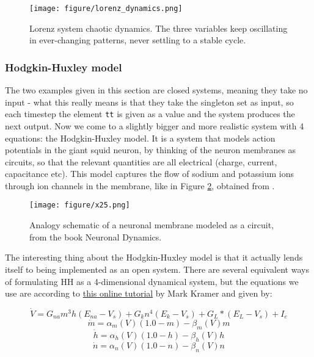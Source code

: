 \begin{figure}
    \centering
    \texttt{[image: figure/lorenz\_dynamics.png]}
    \caption{Lorenz system chaotic dynamics. The three variables keep oscillating in ever-changing patterns, never settling to a stable cycle.}
    \label{fig:lorenz_dynamics}
\end{figure}


\subsubsection{Hodgkin-Huxley model}
\label{section:hh}
The two examples given in this section are closed systems, meaning they take no input - what this really means is that they take the singleton set as input, so each timestep the element \texttt{tt} is given as a value and the system produces the next output. Now we come to a slightly bigger and more realistic system with 4 equations: the Hodgkin-Huxley \cite{hodgkin1952quantitative} model. It is a system that models action potentials in the giant squid neuron, by thinking of the neuron membranes as circuits, so that the relevant quantities are all electrical (charge, current, capacitance etc). This model captures the flow of sodium and potassium ions through ion channels in the membrane, like in Figure \ref{fig:hodgkinhuxleyschematic}, obtained from \cite{gerstner2014neuronal}.

\begin{figure}
    \centering
    \texttt{[image: figure/x25.png]}
    \caption{Analogy schematic of a neuronal membrane modeled as a circuit, from the book Neuronal Dynamics.}
    \label{fig:hodgkinhuxleyschematic}
\end{figure}

The interesting thing about the Hodgkin-Huxley model is that it actually lends itself to being implemented as an open system. There are several equivalent ways of formulating HH as a 4-dimensional dynamical system, but the equations we use are according to \href{https://mark-kramer.github.io/Case-Studies-Python/HH.html}{this online tutorial} by Mark Kramer and given by:

\begin{equation}
\dot{V} =  G_{na}m^3h(E_{na} - V_s) + G_kn^4(E_k - V_s) + G_L * (E_L - V_s) + I_e
\label{eq:voltage}
\end{equation}
\begin{equation}
\dot{m} = \alpha_m(V)(1.0 - m) - \beta_m(V)m
\label{eq:mhh}
\end{equation}
\begin{equation}
\dot{h} = \alpha_h(V)(1.0 - h) - \beta_h(V)h
\label{eq:hhh}
\end{equation}
\begin{equation}
\dot{n} = \alpha_n(V)(1.0 - n) - \beta_n(V)n   
\label{eq:nhh}
\end{equation}

